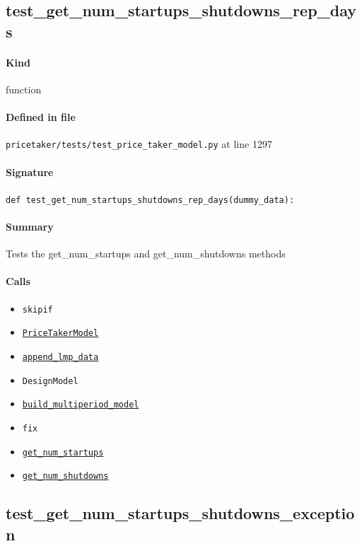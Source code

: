 \documentclass[11pt]{report}
\begin{document}
\subsection{test\_get\_num\_startups\_shutdowns\_rep\_days}
\label{def:pricetaker-tests-test_price_taker_model.py:test_get_num_startups_shutdowns_rep_days:L1297}
\paragraph{Kind} function
\paragraph{Defined in file} \texttt{pricetaker/tests/test\_price\_taker\_model.py} at line 1297
\paragraph{Signature} \texttt{def test\_get\_num\_startups\_shutdowns\_rep\_days(dummy\_data):}
\paragraph{Summary} Tests the get\_num\_startups and get\_num\_shutdowns methods
\paragraph{Calls}
\begin{itemize}[leftmargin=*]
  \item \texttt{skipif}
  \item \hyperref[def:pricetaker-price_taker_model.py:PriceTakerModel:L161]{\texttt{PriceTakerModel}}
  \item \hyperref[def:pricetaker-price_taker_model.py:PriceTakerModel.append_lmp_data:L221]{\texttt{append\_lmp\_data}}
  \item \texttt{DesignModel}
  \item \hyperref[def:pricetaker-price_taker_model.py:PriceTakerModel.build_multiperiod_model:L291]{\texttt{build\_multiperiod\_model}}
  \item \texttt{fix}
  \item \hyperref[def:pricetaker-price_taker_model.py:PriceTakerModel.get_num_startups:L1182]{\texttt{get\_num\_startups}}
  \item \hyperref[def:pricetaker-price_taker_model.py:PriceTakerModel.get_num_shutdowns:L1186]{\texttt{get\_num\_shutdowns}}
\end{itemize}
\subsection{test\_get\_num\_startups\_shutdowns\_exception}
\label{def:pricetaker-tests-test_price_taker_model.py:test_get_num_startups_shutdowns_exception:L1327}
\end{document}
